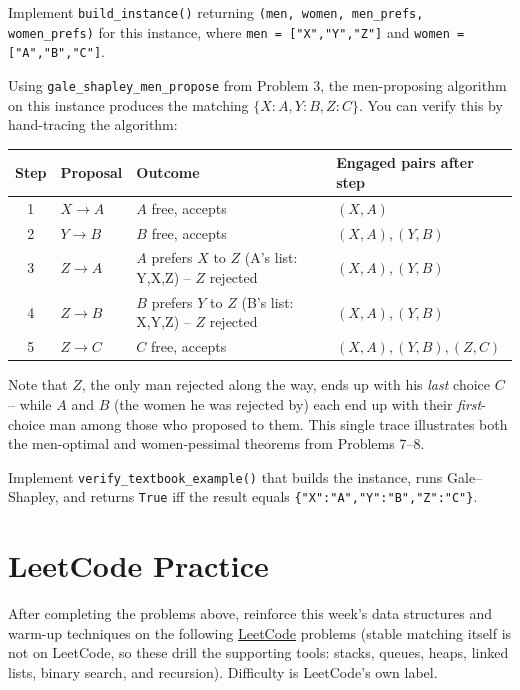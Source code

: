 \documentclass[11pt]{article}
\begin{document}
Implement \texttt{build\_instance()} returning \texttt{(men, women, men\_prefs,
women\_prefs)} for this instance, where \texttt{men = ["X","Y","Z"]} and
\texttt{women = ["A","B","C"]}.

Using \texttt{gale\_shapley\_men\_propose} from Problem 3, the men-proposing algorithm on
this instance produces the matching $\{X{:}A, Y{:}B, Z{:}C\}$. You can verify this by
hand-tracing the algorithm:

\begin{center}
\begin{tabular}{@{}clll@{}}
\toprule
Step & Proposal & Outcome & Engaged pairs after step \\
\midrule
1 & $X \to A$ & $A$ free, accepts & $(X,A)$ \\
2 & $Y \to B$ & $B$ free, accepts & $(X,A), (Y,B)$ \\
3 & $Z \to A$ & $A$ prefers $X$ to $Z$ (A's list: Y,X,Z) -- $Z$ rejected & $(X,A), (Y,B)$ \\
4 & $Z \to B$ & $B$ prefers $Y$ to $Z$ (B's list: X,Y,Z) -- $Z$ rejected & $(X,A), (Y,B)$ \\
5 & $Z \to C$ & $C$ free, accepts & $(X,A), (Y,B), (Z,C)$ \\
\bottomrule
\end{tabular}
\end{center}

Note that $Z$, the only man rejected along the way, ends up with his \emph{last} choice
$C$ -- while $A$ and $B$ (the women he was rejected by) each end up with their
\emph{first}-choice man among those who proposed to them. This single trace illustrates
both the men-optimal and women-pessimal theorems from Problems 7--8.

Implement \texttt{verify\_textbook\_example()} that builds the instance, runs
Gale--Shapley, and returns \texttt{True} iff the result equals
\texttt{\{"X":"A","Y":"B","Z":"C"\}}.

\newpage
\section{LeetCode Practice}

After completing the problems above, reinforce this week's data structures and warm-up
techniques on the following \href{https://leetcode.com}{LeetCode} problems (stable matching
itself is not on LeetCode, so these drill the supporting tools: stacks, queues, heaps,
linked lists, binary search, and recursion). Difficulty is LeetCode's own label.
\end{document}
